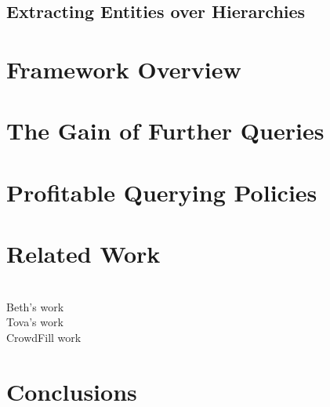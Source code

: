 \documentclass{sig-alternate}
\begin{document}
\subsection{Extracting Entities over Hierarchies}

\section{Framework Overview}
\subsection{}
\subsection{}
\subsection{}

\section{The Gain of Further Queries}

\section{Profitable Querying Policies}

\section{Related Work}

\ \\Beth's work
\ \\Tova's work
\ \\CrowdFill work

\section{Conclusions}




\end{document}
